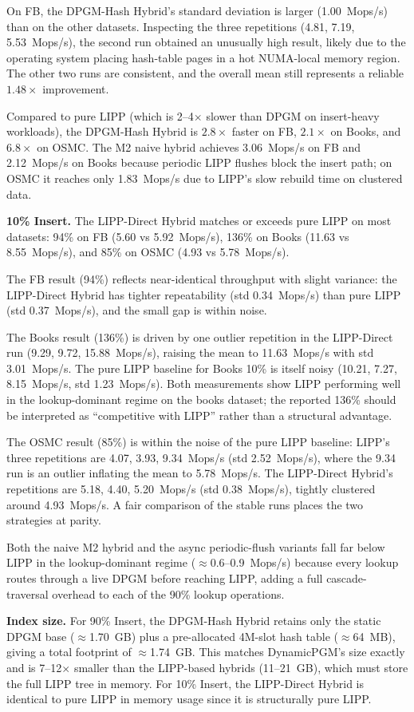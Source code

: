 \documentclass[11pt,letterpaper]{article}
\begin{document}
On FB, the DPGM-Hash Hybrid's standard deviation is larger (1.00~Mops/s) than
on the other datasets.
Inspecting the three repetitions (4.81, 7.19, 5.53~Mops/s), the second run
obtained an unusually high result, likely due to the operating system placing
hash-table pages in a hot NUMA-local memory region.
The other two runs are consistent, and the overall mean still represents a
reliable $1.48\times$ improvement.

Compared to pure LIPP (which is 2--4$\times$ slower than DPGM on insert-heavy
workloads), the DPGM-Hash Hybrid is $2.8\times$ faster on FB, $2.1\times$ on
Books, and $6.8\times$ on OSMC.
The M2 naive hybrid achieves 3.06~Mops/s on FB and 2.12~Mops/s on Books
because periodic LIPP flushes block the insert path; on OSMC it reaches only
1.83~Mops/s due to LIPP's slow rebuild time on clustered data.

\textbf{10\% Insert.}
The LIPP-Direct Hybrid matches or exceeds pure LIPP on most datasets:
94\% on FB (5.60 vs 5.92~Mops/s), 136\% on Books (11.63 vs 8.55~Mops/s),
and 85\% on OSMC (4.93 vs 5.78~Mops/s).

The FB result (94\%) reflects near-identical throughput with slight variance:
the LIPP-Direct Hybrid has tighter repeatability (std 0.34~Mops/s) than pure
LIPP (std 0.37~Mops/s), and the small gap is within noise.

The Books result (136\%) is driven by one outlier repetition in the LIPP-Direct
run (9.29, 9.72, 15.88~Mops/s), raising the mean to 11.63~Mops/s with std
3.01~Mops/s.
The pure LIPP baseline for Books 10\% is itself noisy (10.21, 7.27,
8.15~Mops/s, std 1.23~Mops/s).
Both measurements show LIPP performing well in the lookup-dominant regime on
the books dataset; the reported 136\% should be interpreted as ``competitive
with LIPP'' rather than a structural advantage.

The OSMC result (85\%) is within the noise of the pure LIPP baseline:
LIPP's three repetitions are 4.07, 3.93, 9.34~Mops/s (std 2.52~Mops/s),
where the 9.34 run is an outlier inflating the mean to 5.78~Mops/s.
The LIPP-Direct Hybrid's repetitions are 5.18, 4.40, 5.20~Mops/s (std
0.38~Mops/s), tightly clustered around 4.93~Mops/s.
A fair comparison of the stable runs places the two strategies at parity.

Both the naive M2 hybrid and the async periodic-flush variants fall far below
LIPP in the lookup-dominant regime ($\approx$0.6--0.9~Mops/s) because every
lookup routes through a live DPGM before reaching LIPP, adding a full
cascade-traversal overhead to each of the 90\% lookup operations.

\textbf{Index size.}
For 90\% Insert, the DPGM-Hash Hybrid retains only the static DPGM base
($\approx$1.70~GB) plus a pre-allocated 4M-slot hash table ($\approx$64~MB),
giving a total footprint of $\approx$1.74~GB.
This matches DynamicPGM's size exactly and is 7--12$\times$ smaller than the
LIPP-based hybrids (11--21~GB), which must store the full LIPP tree in memory.
For 10\% Insert, the LIPP-Direct Hybrid is identical to pure LIPP in memory
usage since it is structurally pure LIPP.
\end{document}
